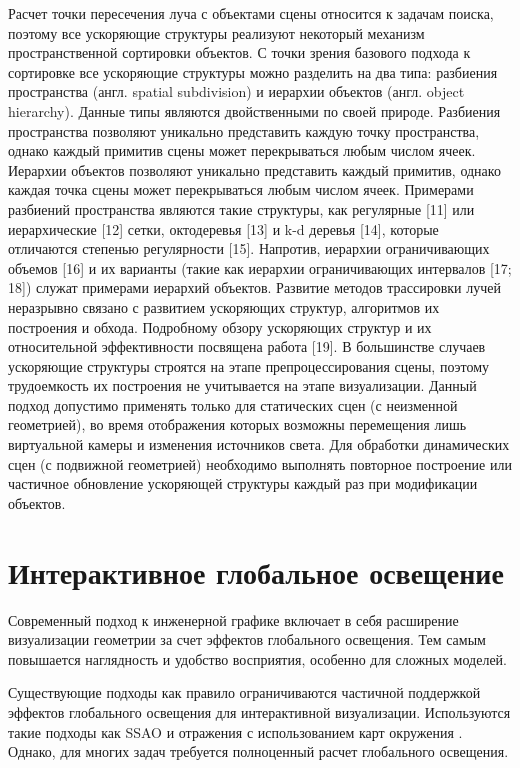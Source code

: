 {{{{Расчет точки пересечения луча с объектами сцены относится к задачам поиска, поэтому все ускоряющие структуры реализуют некоторый механизм пространственной сортировки объектов. С точки зрения базового подхода к сортировке все ускоряющие структуры можно разделить на два типа: разбиения пространства (англ. spatial subdivision) и иерархии объектов (англ. object hierarchy). Данные типы являются двойственными по своей природе. Разбиения пространства позволяют уникально представить каждую точку пространства, однако каждый примитив сцены может перекрываться любым числом ячеек. Иерархии объектов позволяют уникально представить каждый примитив, однако каждая точка сцены может перекрываться любым числом ячеек. Примерами разбиений пространства являются такие структуры, как регулярные [11] или иерархические [12] сетки, октодеревья [13] и k-d деревья [14], которые отличаются степенью регулярности [15]. Напротив, иерархии ограничивающих объемов [16] и их варианты (такие как иерархии ограничивающих интервалов [17; 18]) служат примерами иерархий объектов. Развитие методов трассировки лучей неразрывно связано с развитием ускоряющих структур, алгоритмов их построения и обхода. Подробному обзору ускоряющих структур и их относительной эффективности посвящена работа [19].
В большинстве случаев ускоряющие структуры строятся на этапе препроцессирования сцены, поэтому трудоемкость их построения не учитывается на этапе визуализации. Данный подход допустимо применять только для статических сцен (с неизменной геометрией), во время отображения которых возможны перемещения лишь виртуальной камеры и изменения источников света. Для обработки динамических сцен (с подвижной геометрией) необходимо выполнять повторное построение или частичное обновление ускоряющей структуры каждый раз при модификации объектов.

\section{Интерактивное глобальное освещение} \label{sect_GI}

Современный подход к инженерной графике включает в себя расширение визуализации геометрии за счет эффектов глобального освещения. Тем самым повышается наглядность и удобство восприятия, особенно для сложных моделей.


Существующие подходы как правило ограничиваются частичной поддержкой эффектов глобального освещения для интерактивной визуализации. Используются такие подходы как SSAO и отражения с использованием карт окружения . Однако, для многих задач требуется полноценный расчет глобального освещения.

}}}}
